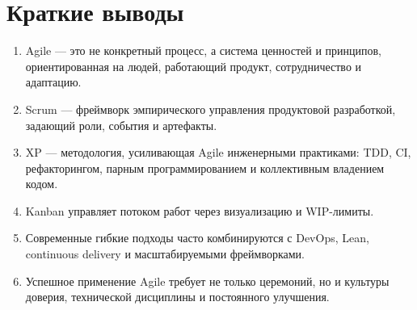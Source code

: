 \documentclass[12pt,a4paper]{article}
\begin{document}
\section{Краткие выводы}

\begin{enumerate}
    \item Agile --- это не конкретный процесс, а система ценностей и принципов, ориентированная на людей, работающий продукт, сотрудничество и адаптацию.
    \item Scrum --- фреймворк эмпирического управления продуктовой разработкой, задающий роли, события и артефакты.
    \item XP --- методология, усиливающая Agile инженерными практиками: TDD, CI, рефакторингом, парным программированием и коллективным владением кодом.
    \item Kanban управляет потоком работ через визуализацию и WIP-лимиты.
    \item Современные гибкие подходы часто комбинируются с DevOps, Lean, continuous delivery и масштабируемыми фреймворками.
    \item Успешное применение Agile требует не только церемоний, но и культуры доверия, технической дисциплины и постоянного улучшения.
\end{enumerate}
\end{document}
